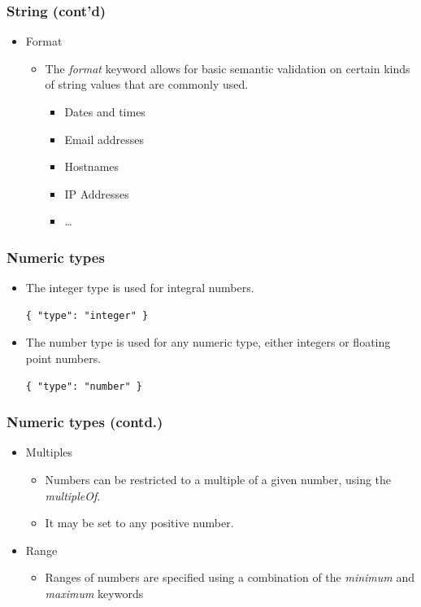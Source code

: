 \documentclass{efd-lecture}
\begin{document}
\begin{frame}
  \frametitle{String (cont'd)}
  \begin{itemize}
    \item Format
    \begin{itemize}
      \item The \textit{\color{Cyan}format} keyword allows for basic
        semantic validation on certain kinds of string values that are
        commonly used.
      \begin{itemize}
        \item Dates and times
        \item Email addresses
        \item Hostnames
        \item IP Addresses
        \item \ldots
      \end{itemize}
    \end{itemize}
  \end{itemize}
\end{frame}

\begin{frame}[fragile]
  \frametitle{Numeric types}
  \begin{itemize}
    \item The integer type is used for integral numbers.
    \begin{verbatim}
{ "type": "integer" }
    \end{verbatim}
    \item
      The number type is used for any numeric type, either integers or
      floating point numbers.

    \begin{verbatim}
{ "type": "number" }
    \end{verbatim}
  \end{itemize}
\end{frame}

\begin{frame}
  \frametitle{Numeric types (contd.)}
  \begin{itemize}
    \item Multiples
    \begin{itemize}
      \item
        Numbers can be restricted to a multiple of a given number, using the
        \textit{\color{YellowOrange}multipleOf}.

      \item It may be set to any positive number.
    \end{itemize}
    \item Range
    \begin{itemize}
      \item
        Ranges of numbers are specified using a combination of the
        \textit{\color{YellowOrange}minimum} and
        \textit{\color{YellowOrange}maximum} keywords

    \end{itemize}
  \end{itemize}
\end{frame}
\end{document}
